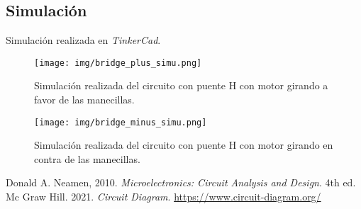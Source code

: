 \documentclass[conference]{IEEEtran}
\begin{document}
\subsection{Simulación}
Simulación realizada en \textit{TinkerCad}.
\begin{figure}[H]
	\centering
	\texttt{[image: img/bridge\_plus\_simu.png]}
	\caption{Simulación realizada del circuito con puente H con motor girando a favor de las manecillas.}
	\label{bridge_plus_simu}
\end{figure}

\begin{figure}[H]
	\centering
	\texttt{[image: img/bridge\_minus\_simu.png]}
	\caption{Simulación realizada del circuito con puente H con motor girando en contra de las manecillas.}
	\label{bridge_minus_simu}
\end{figure}


\begin{thebibliography}{00}
 Donald A. Neamen, 2010. \textit{Microelectronics: Circuit Analysis and Design}. 4th ed. Mc Graw Hill.
 2021. \textit{Circuit Diagram}. \url{https://www.circuit-diagram.org/}
\end{thebibliography}
\end{document}
